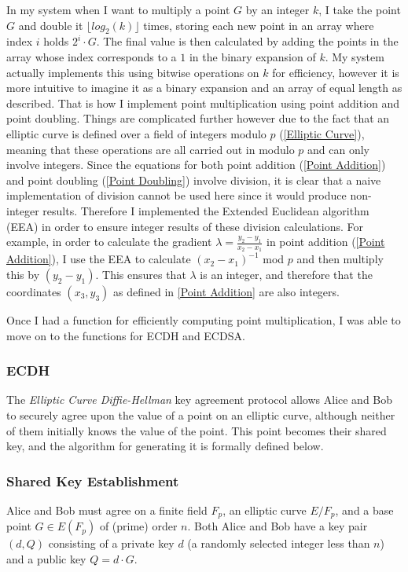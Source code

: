\documentclass[12pt,a4paper]{article}
\begin{document}
In my system when I want to multiply a point $G$ by an integer $k$, 
I take the point $G$ and double it $\lfloor log_2(k) \rfloor$ times, storing each new point in an array where index $i$ holds $2^i \cdot G$. 
The final value is then calculated by adding the points in the array whose index corresponds to a $1$ in the binary expansion of $k$. 
My system actually implements this using bitwise operations on $k$ for efficiency, 
however it is more intuitive to imagine it as a binary expansion and an array of equal length as described. 
That is how I implement point multiplication using point addition and point doubling. 
Things are complicated further however due to the fact that an elliptic curve is defined over a field of integers modulo $p$ (\ref{Elliptic Curve}), 
meaning that these operations are all carried out in modulo $p$ and can only involve integers. 
Since the equations for both point addition (\ref{Point Addition}) and point doubling (\ref{Point Doubling}) involve division, 
it is clear that a naive implementation of division cannot be used here since it would produce non-integer results. 
Therefore I implemented the Extended Euclidean algorithm (EEA) in order to ensure integer results of these division calculations. 
For example, in order to calculate the gradient $\lambda = \frac{y_2-y_1}{x_2-x_1}$ in point addition (\ref{Point Addition}), 
I use the EEA to calculate $(x_2-x_1)^{-1}$ mod $p$ and then multiply this by $(y_2-y_1)$. 
This ensures that $\lambda$ is an integer, and therefore that the coordinates $(x_3,y_3)$ as defined in \ref{Point Addition} 
are also integers. 

Once I had a function for efficiently computing point multiplication, I was able to move on to the functions for ECDH and ECDSA. 

\subsubsection{ECDH} \noindent \label{ECDH}
The \emph{Elliptic Curve Diffie-Hellman} key agreement protocol allows Alice and Bob 
to securely agree upon the value of a point on an elliptic curve, although neither of them initially knows the value of the point. 
This point becomes their shared key, and the algorithm for generating it is formally defined below. 


\subsubsection{Shared Key Establishment} \noindent \label{SharedKey}
Alice and Bob must agree on a finite field $F_p$, an elliptic curve $E/F_p$, and a base point $G \in E(F_p)$  of (prime) order $n$.
Both Alice and Bob have a key pair $(d,Q)$ consisting of a private key $d$ (a randomly selected integer less than $n$) 
and a public key $Q = d \cdot G$.
\end{document}
